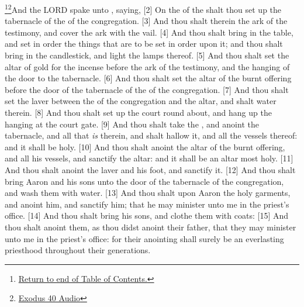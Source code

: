 \footnote{\textcolor[cmyk]{0.99998,1,0,0}{\hyperlink{TOC}{Return to end of Table of Contents.}}}\footnote{\href{https://audiobible.com/bible/exodus_40.html}{\textcolor[cmyk]{0.99998,1,0,0}{Exodus 40 Audio}}}\textcolor[cmyk]{0.99998,1,0,0}{And the LORD spake unto , saying,}
[2] \textcolor[cmyk]{0.99998,1,0,0}{On the  of the  shalt thou set up the tabernacle of the  of the congregation.}
[3] \textcolor[cmyk]{0.99998,1,0,0}{And thou shalt  therein the ark of the testimony, and cover the ark with the vail.}
[4] \textcolor[cmyk]{0.99998,1,0,0}{And thou shalt bring in the table, and set in order the things that are to be set in order upon it; and thou shalt bring in the candlestick, and light the lamps thereof.}
[5] \textcolor[cmyk]{0.99998,1,0,0}{And thou shalt set the altar of gold for the incense before the ark of the testimony, and  the hanging of the door to the tabernacle.}
[6] \textcolor[cmyk]{0.99998,1,0,0}{And thou shalt set the altar of the burnt offering before the door of the tabernacle of the  of the congregation.}
[7] \textcolor[cmyk]{0.99998,1,0,0}{And thou shalt set the laver between the  of the congregation and the altar, and shalt  water therein.}
[8] \textcolor[cmyk]{0.99998,1,0,0}{And thou shalt set up the court round about, and hang up the hanging at the court gate.}
[9] \textcolor[cmyk]{0.99998,1,0,0}{And thou shalt take the , and anoint the tabernacle, and all that \emph{is} therein, and shalt hallow it, and all the vessels thereof: and it shall be holy.}
[10] \textcolor[cmyk]{0.99998,1,0,0}{And thou shalt anoint the altar of the burnt offering, and all his vessels, and sanctify the altar: and it shall be an altar most holy.}
[11] \textcolor[cmyk]{0.99998,1,0,0}{And thou shalt anoint the laver and his foot, and sanctify it.}
[12] \textcolor[cmyk]{0.99998,1,0,0}{And thou shalt bring Aaron and his sons unto the door of the tabernacle of the congregation, and wash them with water.}
[13] \textcolor[cmyk]{0.99998,1,0,0}{And thou shalt  upon Aaron the holy garments, and anoint him, and sanctify him; that he may minister unto me in the priest's office.}
[14] \textcolor[cmyk]{0.99998,1,0,0}{And thou shalt bring his sons, and clothe them with coats:}
[15] \textcolor[cmyk]{0.99998,1,0,0}{And thou shalt anoint them, as thou didst anoint their father, that they may minister unto me in the priest's office: for their anointing shall surely be an everlasting priesthood throughout their generations.}
